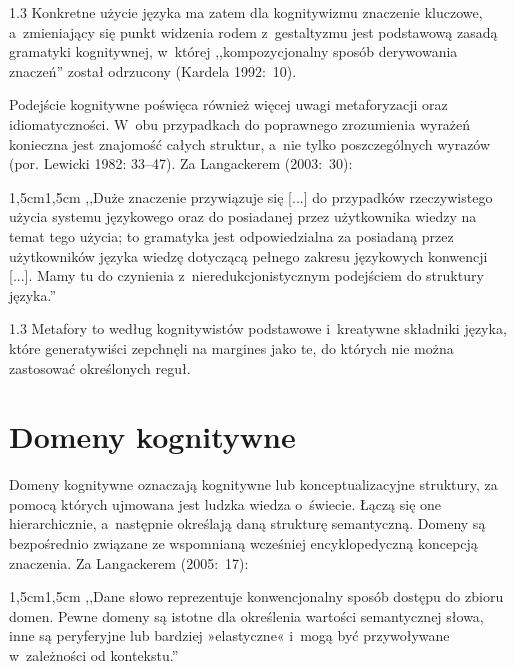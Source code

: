 \documentclass[11pt,a4paper,twoside]{report}
\begin{document}
\begin{spacing}{1.3}
Konkretne użycie języka ma zatem dla kognitywizmu znaczenie kluczowe, a~zmieniający się punkt widzenia rodem z~gestaltyzmu jest podstawową zasadą gramatyki kognitywnej, w~której ,,kompozycjonalny sposób derywowania znaczeń'' został odrzucony (Kardela 1992:~10).

Podejście kognitywne poświęca również więcej uwagi metaforyzacji oraz idiomatyczności. W~obu przypadkach do poprawnego zrozumienia wyrażeń konieczna jest znajomość całych struktur, a~nie tylko poszczególnych wyrazów (por. Lewicki 1982: 33--47). Za Langackerem (2003:~30):
\end{spacing}
\begin{adjustwidth}{1,5cm}{1,5cm}
\small{
,,Duże znaczenie przywiązuje się [...] do przypadków rzeczywistego użycia systemu językowego oraz do posiadanej przez użytkownika wiedzy na temat tego użycia; to gramatyka jest odpowiedzialna za posiadaną przez użytkowników języka wiedzę dotyczącą pełnego zakresu językowych konwencji [...]. Mamy tu do czynienia z~nieredukcjonistycznym podejściem do struktury języka.''\\
}
\end{adjustwidth}
\begin{spacing}{1.3}
Metafory to według kognitywistów podstawowe i~kreatywne składniki języka, które generatywiści zepchnęli na margines jako te, do których nie można zastosować określonych reguł.
\newpage
\section{Domeny kognitywne}
Domeny kognitywne oznaczają kognitywne lub konceptualizacyjne struktury, za pomocą których ujmowana jest ludzka wiedza o~świecie. Łączą się one hierarchicznie, \linebreak a~następnie określają daną strukturę semantyczną. Domeny są bezpośrednio związane \linebreak ze wspomnianą wcześniej encyklopedyczną koncepcją znaczenia. Za Langackerem \linebreak (2005:~17):
\end{spacing}
\begin{adjustwidth}{1,5cm}{1,5cm}
\small{
,,Dane słowo reprezentuje konwencjonalny sposób dostępu do zbioru domen. Pewne domeny są istotne dla określenia wartości semantycznej sło\-wa, inne są peryferyjne lub bardziej »elastyczne« i~mogą być przywoływane w~zależności od kontekstu.''\\
}
\end{adjustwidth}
\end{document}
